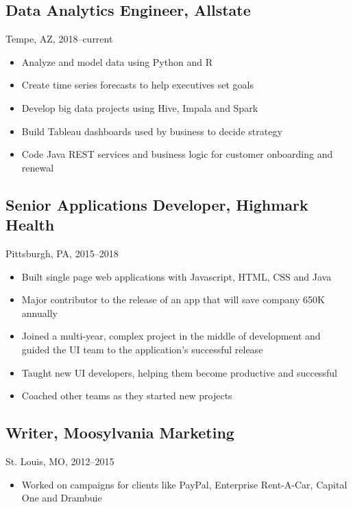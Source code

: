 \documentclass[11pt]{article}
\begin{document}
	\subsection{\normalsize{Data Analytics Engineer, Allstate}}
	{\fontsize{10pt}{\parskip}\selectfont Tempe, AZ, 2018--current}
	\begin{itemize}
	\item Analyze and model data using Python and R
	\item Create time series forecasts to help executives set goals
	\item Develop big data projects using Hive, Impala and Spark
	\item Build Tableau dashboards used by business to decide strategy
	\item Code Java REST services and business logic for customer onboarding and renewal
	\end{itemize}

	 \subsection{\normalsize{Senior Applications Developer, Highmark Health}}
		{\fontsize{10pt}{\parskip}\selectfont Pittsburgh, PA, 2015--2018}
		\begin{itemize}
		\item Built single page web applications with Javascript, HTML, CSS and Java
		\item Major contributor to the release of an app that will save company 650K annually
		\item Joined a multi-year, complex project in the middle of development and guided the UI team to the application's successful release
		\item Taught new UI developers, helping them become productive and successful
		\item Coached other teams as they started new projects
		\end{itemize}

	\subsection{\normalsize{Writer, Moosylvania Marketing}}
	{\fontsize{10pt}{\parskip}\selectfont St. Louis, MO, 2012--2015}
	\begin{itemize}
		\item Worked on campaigns for clients like PayPal, Enterprise Rent-A-Car, Capital One and Drambuie
	\end{itemize}
\end{document}
